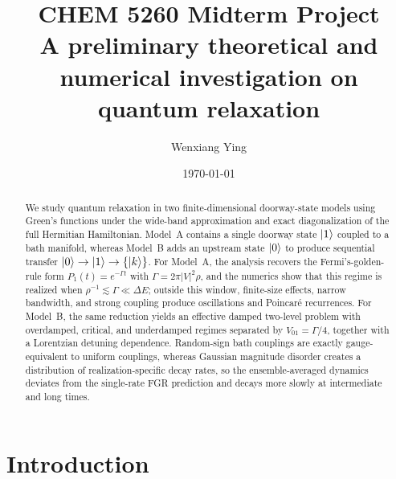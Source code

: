 \documentclass[aps,prx,reprint,showpacs,showkeys,floatfix]{revtex4-2}
\begin{document}
\title{CHEM 5260 Midterm Project \\
A preliminary theoretical and numerical investigation on quantum relaxation}

\author{Wenxiang Ying}

\date{\today}

\begin{abstract}
We study quantum relaxation in two finite-dimensional doorway-state models
using Green's functions under the wide-band approximation and exact
diagonalization of the full Hermitian Hamiltonian.  Model~A contains a
single doorway state $\ket{1}$ coupled to a bath manifold, whereas Model~B
adds an upstream state $\ket{0}$ to produce sequential transfer
$\ket{0}\to\ket{1}\to\{\ket{k}\}$.  For Model~A, the analysis recovers the
Fermi's-golden-rule form $P_1(t)=e^{-\Gamma t}$ with
$\Gamma=2\pi |V|^2\rho$, and the numerics show that this regime is realized
when $\rho^{-1}\lesssim\Gamma\ll\Delta E$; outside this window, finite-size
effects, narrow bandwidth, and strong coupling produce oscillations and
Poincar\'e recurrences.  For Model~B, the same reduction yields an
effective damped two-level problem with overdamped, critical, and
underdamped regimes separated by $V_{01}=\Gamma/4$, together with a
Lorentzian detuning dependence.  Random-sign bath couplings are exactly
gauge-equivalent to uniform couplings, whereas Gaussian magnitude disorder
creates a distribution of realization-specific decay rates, so the
ensemble-averaged dynamics deviates from the single-rate FGR prediction and
decays more slowly at intermediate and long times.
\end{abstract}


\maketitle
\tableofcontents

\section{Introduction}
\end{document}
